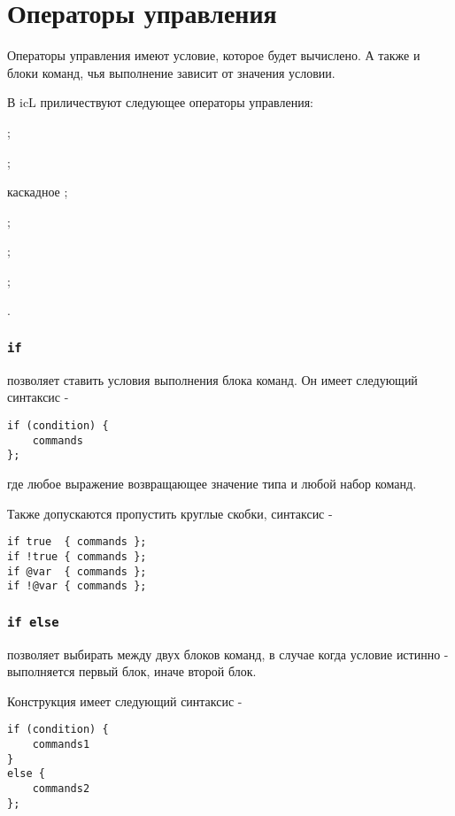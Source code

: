 \section{Операторы управления}

Операторы управления имеют условие, которое будет вычислено. А также и блоки команд, чья выполнение зависит от значения условии.

В icL приличествуют следующее операторы управления:
\begin{icItems}
	\item {};
	\item {};
	\item каскадное ;
	\item {};
	\item {};
	\item {};
	\item {}.
\end{icItems}

\subsubsection{\lstinline|if|}

 позволяет ставить условия выполнения блока команд. Он имеет следующий синтаксис -
\begin{lstlisting}[numbers=none]
if (condition) {
	commands
};
\end{lstlisting}
где  любое выражение возвращающее значение типа \bool{} и  любой набор команд.

Также допускаются пропустить круглые скобки, синтаксис -
\begin{lstlisting}[numbers=none]
if true  { commands };
if !true { commands };
if @var  { commands };
if !@var { commands };
\end{lstlisting}

\subsubsection{\lstinline|if else|}

 позволяет выбирать между двух блоков команд, в случае когда условие истинно - выполняется первый блок, иначе второй блок.

Конструкция  имеет следующий синтаксис -
\begin{lstlisting}[numbers=none]
if (condition) {
	commands1
}
else {
	commands2
};
\end{lstlisting}

